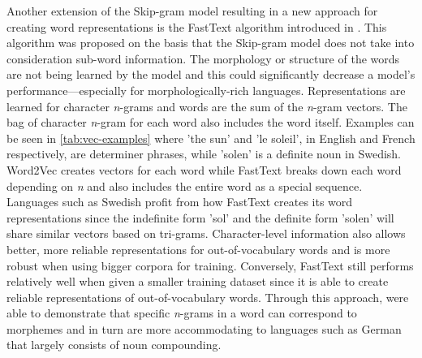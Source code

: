 Another extension of the Skip-gram model resulting in a new approach for creating word representations is the FastText algorithm introduced in \citet{bojanowski2017enriching}. This algorithm was proposed on the basis that the Skip-gram model does not take into consideration sub-word information. The morphology or structure of the words are not being learned by the model and this could significantly decrease a model’s performance—especially for morphologically-rich languages. Representations are learned for character \emph{n}-grams and words are the sum of the \emph{n}-gram vectors. The bag of character \emph{n}-gram for each word also includes the word itself. Examples can be seen in \autoref{tab:vec-examples} where 'the sun' and 'le soleil', in English and French respectively, are determiner phrases,  while 'solen' is a definite noun in Swedish. Word2Vec creates vectors for each word while FastText breaks down each word depending on \emph{n} and also includes the entire word as a special sequence. Languages such as Swedish profit from how FastText creates its word representations since the indefinite form 'sol' and the definite form 'solen' will share similar vectors based on tri-grams. Character-level information also allows better, more reliable representations for out-of-vocabulary words and is more robust when using bigger corpora for training. Conversely, FastText still performs relatively well when given a smaller training dataset since it is able to create reliable representations of out-of-vocabulary words. Through this approach, \citet{bojanowski2017enriching} were able to demonstrate that specific \emph{n}-grams in a word can correspond to morphemes and in turn are more accommodating to languages such as German that largely consists of noun compounding.



